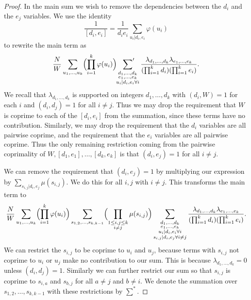 \documentclass[12pt,a4paper]{amsart}
\theoremstyle{plain}
\numberwithin{sblmm}{thrm}
\numberwithin{equation}{section}
\renewcommand{\phi}{\varphi}
\begin{document}
\begin{proof}
In the main sum we wish to remove the dependencies between the $d_i$ and the $e_j$ variables. We use the identity
\begin{equation}\frac{1}{[d_i,e_i]}=\frac{1}{d_ie_i}\sum_{u_i|d_i,e_i}\phi(u_i)\end{equation}
to rewrite the main term as
\begin{equation}
\frac{N}{W}\sum_{u_1,\dotsc,u_k}\Bigl(\prod_{i=1}^k \phi(u_i)\Bigr)\sideset{}{'}\sum_{\substack{d_1,\dotsc,d_k\\e_1,\dotsc,e_k\\u_i|d_i,e_i\forall i}}\frac{\lambda_{d_1,\dotsc,d_k}\lambda_{e_1,\dotsc,e_k}}{(\prod_{i=1}^kd_i) (\prod_{i=1}^ke_i)}.
\end{equation}
We recall that $\lambda_{d_1,\dotsc,d_k}$ is supported on integers $d_1,\dotsc,d_k$ with $(d_i,W)=1$ for each $i$ and $(d_i,d_j)=1$ for all $i\ne j$. Thus we may drop the requirement that $W$ is coprime to each of the $[d_i,e_i]$ from the summation, since these terms have no contribution. Similarly, we may drop the requirement that the $d_i$ variables are all pairwise coprime, and the requirement that the $e_i$ variables are all pairwise coprime. Thus the only remaining restriction coming from the pairwise coprimality of $W,[d_1,e_1],\dotsc,[d_k,e_k]$ is that $(d_i,e_j)=1$ for all $i\ne j$.

We can remove the requirement that $(d_i,e_j)=1$ by multiplying our expression by $\sum_{s_{i,j}|d_i,e_j}\mu(s_{i,j})$. We do this for all $i, j$ with $i\ne j$. This transforms the main term to
\begin{equation}
\frac{N}{W}\sum_{u_1,\dotsc,u_k}\Bigl(\prod_{i=1}^k\phi(u_i)\Bigr)\sum_{s_{1,2},\dotsc,s_{k,k-1}}\Bigl(\prod_{\substack{1\le i,j\le k\\i\ne j}}\mu(s_{i,j})\Bigr)\sum_{\substack{d_1,\dotsc, d_k\\ e_1,\dotsc,e_k\\ u_i|d_i,e_i\forall i\\ s_{i,j}|d_i,e_j\forall i\ne j}}\frac{\lambda_{d_1,\dotsc,d_k}\lambda_{e_1,\dotsc,e_k}}{(\prod_{i=1}^kd_i)(\prod_{i=1}^k e_i)}.\label{eq:S1MainTerm}
\end{equation}
We can restrict the $s_{i,j}$ to be coprime to $u_i$ and $u_j$, because terms with $s_{i,j}$ not coprime to $u_i$ or $u_j$ make no contribution to our sum. This is because $\lambda_{d_1,\dots,d_k}=0$ unless $(d_i,d_j)=1$. Similarly we can further restrict our sum so that $s_{i,j}$ is coprime to $s_{i,a}$ and $s_{b,j}$ for all $a\ne j$ and $b\ne i$. We denote the summation over $s_{1,2},\dotsc,s_{k,k-1}$ with these restrictions by $\sum^*$.


\end{proof}
\end{document}

